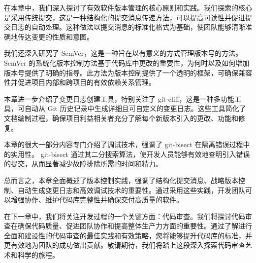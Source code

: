 在本章中，我们深入探讨了有效软件版本管理的核心原则和实践。我们探索的核心是采用传统提交，这是一种结构化的提交消息传递方法，可以提高可读性并促进提交日志的自动处理。这种做法以提交消息的标准化格式为基础，使团队能够清晰准确地传达变更的性质和意图。

我们还深入研究了 SemVer，这是一种旨在以有意义的方式管理版本号的方法。 SemVer 的系统化版本控制方法基于代码库中更改的重要性，为何时以及如何增加版本号提供了明确的指导。此方法为版本控制提供了一个透明的框架，可确保兼容性并促进项目内部和跨项目的有效依赖关系管理。

本章进一步介绍了变更日志创建工具，特别关注了 git-cliff，这是一种多功能工具，可自动从 Git 历史记录中生成详细且可自定义的变更日志。这些工具简化了文档编制过程，确保项目利益相关者充分了解每个新版本引入的更改、功能和修复。

本章的很大一部分内容专门介绍了调试技术，强调了 git-bisect 在隔离错误过程中的实用性。 git-bisect 通过其二分搜索算法，使开发人员能够有效地查明引入错误的提交，从而显著减少故障排除所需的时间和精力。

总而言之，本章全面概述了版本控制实践，强调了结构化提交消息、战略版本控制、自动生成变更日志和高效调试技术的重要性。通过采用这些实践，开发团队可以增强协作、维护代码库完整性并确保交付高质量的软件。

在下一章中，我们将关注开发过程的一个关键方面：代码审查。我们将探讨代码审查在确保代码质量、促进团队协作和提高整体生产力方面的重要性。通过了解进行全面和建设性的代码审查的最佳实践和有效策略，您将能够提升代码库的标准，并更有效地为团队的成功做出贡献。敬请期待，我们将踏上这段深入探索代码审查艺术和科学的旅程。